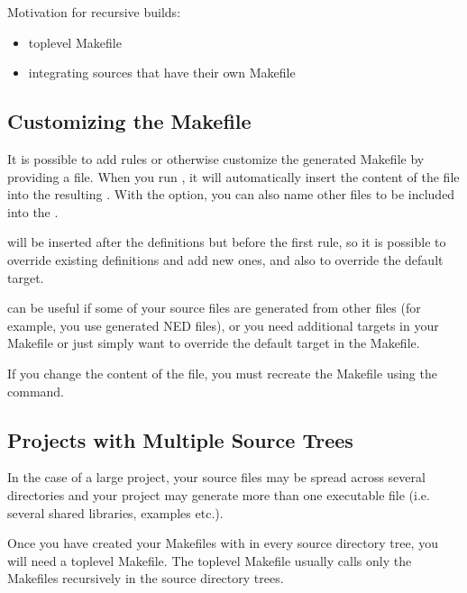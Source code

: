 Motivation for recursive builds:
\begin{itemize}
 \item{toplevel Makefile}
 \item{integrating sources that have their own Makefile}
\end{itemize}


\subsection{Customizing the Makefile}
\label{sec:makefrag}

It is possible to add rules or otherwise customize the generated Makefile
by providing a  file. When you run , it
will automatically insert the content of the  file into the
resulting . With the  option, you can also name other
files to be included into the .

 will be inserted after the definitions but before the first
rule, so it is possible to override existing definitions and add new
ones, and also to override the default target.

 can be useful if some of your source files are generated
from other files (for example, you use generated NED files), or you need
additional targets in your Makefile or just simply want to override the
default target in the Makefile.

\begin{note}
If you change the content of the  file, you must recreate the
Makefile using the  command.
\end{note}

\subsection{Projects with Multiple Source Trees}
\label{sec:build-sim-progs:projects-with-multiple-source-trees}

In the case of a large project, your source files may be spread across
several directories and your project may generate more than one executable
file (i.e. several shared libraries, examples etc.).

Once you have created your Makefiles with  in
every source directory tree, you will need a toplevel Makefile.
The toplevel Makefile usually calls only the Makefiles
recursively in the source directory trees.



